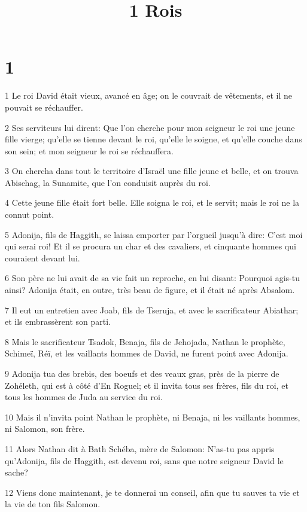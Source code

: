 

\title{1 Rois}


\chapter{1}

\par 1 Le roi David était vieux, avancé en âge; on le couvrait de vêtements, et il ne pouvait se réchauffer.
\par 2 Ses serviteurs lui dirent: Que l'on cherche pour mon seigneur le roi une jeune fille vierge; qu'elle se tienne devant le roi, qu'elle le soigne, et qu'elle couche dans son sein; et mon seigneur le roi se réchauffera.
\par 3 On chercha dans tout le territoire d'Israël une fille jeune et belle, et on trouva Abischag, la Sunamite, que l'on conduisit auprès du roi.
\par 4 Cette jeune fille était fort belle. Elle soigna le roi, et le servit; mais le roi ne la connut point.
\par 5 Adonija, fils de Haggith, se laissa emporter par l'orgueil jusqu'à dire: C'est moi qui serai roi! Et il se procura un char et des cavaliers, et cinquante hommes qui couraient devant lui.
\par 6 Son père ne lui avait de sa vie fait un reproche, en lui disant: Pourquoi agis-tu ainsi? Adonija était, en outre, très beau de figure, et il était né après Absalom.
\par 7 Il eut un entretien avec Joab, fils de Tseruja, et avec le sacrificateur Abiathar; et ils embrassèrent son parti.
\par 8 Mais le sacrificateur Tsadok, Benaja, fils de Jehojada, Nathan le prophète, Schimeï, Réï, et les vaillants hommes de David, ne furent point avec Adonija.
\par 9 Adonija tua des brebis, des boeufs et des veaux gras, près de la pierre de Zohéleth, qui est à côté d'En Roguel; et il invita tous ses frères, fils du roi, et tous les hommes de Juda au service du roi.
\par 10 Mais il n'invita point Nathan le prophète, ni Benaja, ni les vaillants hommes, ni Salomon, son frère.
\par 11 Alors Nathan dit à Bath Schéba, mère de Salomon: N'as-tu pas appris qu'Adonija, fils de Haggith, est devenu roi, sans que notre seigneur David le sache?
\par 12 Viens donc maintenant, je te donnerai un conseil, afin que tu sauves ta vie et la vie de ton fils Salomon.
